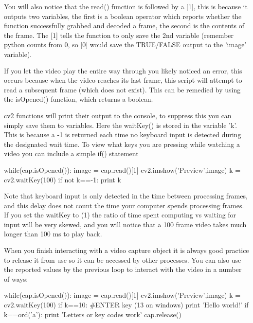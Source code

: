 \documentclass[a4paper,12pt]{article}
\begin{document}
You will also notice that the read() function is followed by a [1], this is because it outputs two variables, the first is a boolean operator which reports whether the function successfully grabbed and decoded a frame, the second is the contents of the frame. The [1] tells the function to only save the 2nd variable (remember python counts from 0, so [0] would save the TRUE/FALSE output to the 'image' variable). 

If you let the video play the entire way through you likely noticed an error, this occurs because when the video reaches its last frame, this script will attempt to read a subsequent frame (which does not exist). This can be remedied by using the isOpened() function, which returns a boolean.

cv2 functions will print their output to the console, to suppress this you can simply save them to variables. Here the waitKey() is stored in the variable 'k'. This is because a -1 is returned each time no keyboard input is detected during the designated wait time. To view what keys you are pressing while watching a video you can include a simple if() statement
\begin{python}
while(cap.isOpened()):
	image = cap.read()[1]
	cv2.imshow('Preview',image)
	k = cv2.waitKey(100)
	if not k==-1:
		print k
\end{python}

Note that keyboard input is only detected in the time between processing frames, and this delay does not count the time your computer spends processing frames. If you set the waitKey to (1) the ratio of time spent computing vs waiting for input will be very skewed, and you will notice that a 100 frame video takes much longer than 100 ms to play back.

When you finish interacting with a video capture object it is always good practice to release it from use so it can be accessed by other processes. You can also use the reported values by the previous loop to interact with the video in a number of ways:
\begin{python}
while(cap.isOpened()):
	image = cap.read()[1]
	cv2.imshow('Preview',image)
	k = cv2.waitKey(100)
	if k==10: #ENTER key (13 on windows)
		print 'Hello world!'
	if k==ord('a'):
		print 'Letters or key codes work'
cap.release()
\end{python}

\newpage
\end{document}
